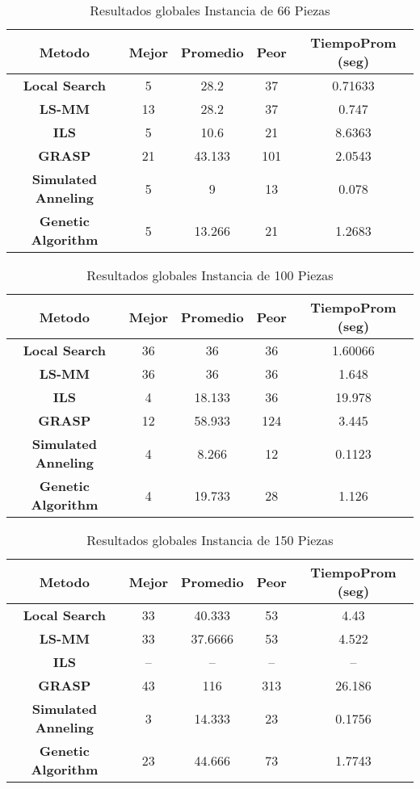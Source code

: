 \begin{center}
\begin{table}
\begin{tabular}{|c|c|c|c|c|}

\hline
{\bf Metodo} & {\bf Mejor} & {\bf Promedio} & {\bf Peor} & {\bf TiempoProm (seg)}\\
\hline
{\bf Local Search} & 5 & 28.2 & 37 & 0.71633\\
\hline
{\bf LS-MM} & 13 & 28.2 & 37 & 0.747\\
\hline
{\bf ILS} & 5 & 10.6 & 21 & 8.6363\\
\hline
{\bf GRASP} & 21 & 43.133 & 101 & 2.0543\\
\hline
{\bf Simulated Anneling} & 5 & 9 & 13 & 0.078\\
\hline
{\bf Genetic Algorithm} & 5 & 13.266 & 21 & 1.2683\\
\hline

\end{tabular}
\caption{Resultados globales Instancia de 66 Piezas}
\end{table}

\begin{table}
\begin{tabular}{|c|c|c|c|c|}

\hline
{\bf Metodo} & {\bf Mejor} & {\bf Promedio} & {\bf Peor} & {\bf TiempoProm (seg)}\\
\hline
{\bf Local Search} & 36 & 36 & 36 & 1.60066\\
\hline
{\bf LS-MM} & 36 & 36 & 36 & 1.648\\
\hline
{\bf ILS} & 4 & 18.133 & 36 & 19.978\\
\hline
{\bf GRASP} & 12 & 58.933 & 124 & 3.445\\
\hline
{\bf Simulated Anneling} & 4 & 8.266 & 12 & 0.1123\\
\hline
{\bf Genetic Algorithm} & 4 & 19.733 & 28 & 1.126\\
\hline

\end{tabular}
\caption{Resultados globales Instancia de 100 Piezas}
\end{table}

\begin{table}
\begin{tabular}{|c|c|c|c|c|}

\hline
{\bf Metodo} & {\bf Mejor} & {\bf Promedio} & {\bf Peor} & {\bf TiempoProm (seg)}\\
\hline
{\bf Local Search} & 33 & 40.333 & 53 & 4.43\\
\hline
{\bf LS-MM} & 33 & 37.6666 & 53 & 4.522\\
\hline
{\bf ILS} & -- & -- & -- & -- \\
\hline
{\bf GRASP} & 43 & 116 & 313 & 26.186\\
\hline
{\bf Simulated Anneling} & 3 & 14.333 & 23 & 0.1756\\
\hline
{\bf Genetic Algorithm} & 23 & 44.666 & 73 & 1.7743\\
\hline

\end{tabular}
\caption{Resultados globales Instancia de 150 Piezas}
\end{table}

\end{center}

